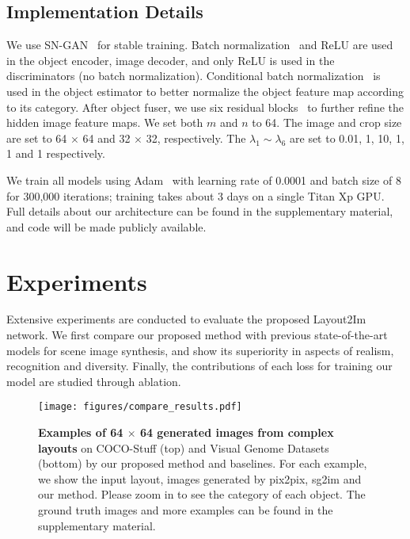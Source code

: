 \documentclass[10pt,twocolumn,letterpaper]{article}
\begin{document}
\subsection{Implementation Details}
We use SN-GAN~\cite{Miyato2018} for stable training. Batch normalization~\cite{ioffe2015batch} and ReLU are used in the object encoder, image decoder, and only ReLU is used in the discriminators (no batch normalization). Conditional batch normalization~\cite{Vries2017} is used in the object estimator to better normalize the object feature map according to its category.
After object fuser, we use six residual blocks~\cite{He2016} to further refine the hidden image feature maps.
We set both $m$ and $n$ to 64. The image and crop size are set to 64 $\times$ 64 and 32 $\times$ 32, respectively. 
The $\lambda_1 \sim \lambda_6$ are set to 0.01, 1, 10, 1, 1 and 1 respectively.

We train all models using Adam~\cite{kingma2014adam} with learning rate of 0.0001 and batch size of 8 for 300,000 iterations; training takes about 3 days on a single Titan Xp GPU.
Full details about our architecture can be found in the supplementary material, and code will be made publicly available.






\section{Experiments}
\label{sec:experiments}
Extensive experiments are conducted to evaluate the proposed Layout2Im network. We first compare our proposed method with previous state-of-the-art models for scene image synthesis, and show its superiority in aspects of realism, recognition and diversity.
Finally, the contributions of each loss for training our model are studied through ablation.

\begin{figure*}[!t]
    \begin{center}
\texttt{[image: figures/compare\_results.pdf]}
    \end{center}
    \vspace{-0.1in}
    \caption{\textbf{Examples of 64 $\times$ 64 generated images from complex layouts} on COCO-Stuff (top) and Visual Genome Datasets (bottom) by our proposed method and baselines. For each example, we show the input layout, images generated by pix2pix, sg2im and our method. Please zoom in to see the category of each object. The ground truth images and more examples can be found in the supplementary material.}
    \label{fig:compare_results}
\end{figure*}
\end{document}
